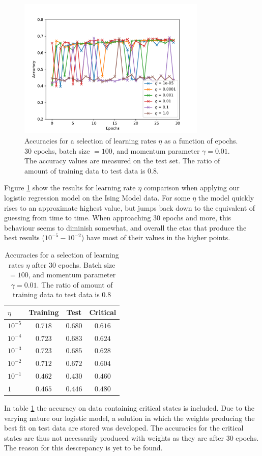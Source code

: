 \begin{figure}[H]
    \centering
\includegraphics[width = 0.8\textwidth]{figures/logistic_eta.pdf}
    \caption{Accuracies for a selection of learning rates $\eta$ as a function of epochs. 
    30 epochs, batch size $= 100$, and momentum parameter $\gamma = 0.01$. The accuracy
    values are measured on the test set.
    The ratio of amount of training data to test data is $0.8$.}
\label{fig:logistic-eta}
\end{figure}
Figure \ref{fig:logistic-eta} show the results for learning rate $\eta$ comparison when applying
our logistic regression model on the Ising Model data. For some $\eta$ the model quickly rises
to an approximate highest value, but jumps back down to the equivalent of guessing from time
to time. When approaching 30 epochs and more, this behaviour seems to diminish somewhat, and
overall the etas that produce the best results ($10^{-5} - 10^{-2}$) have most of their values
in the higher points.
\begin{table}[H]
\center
\begin{tabular}{l|c|c|c}
$\eta$ & Training & Test & Critical  \\
\hline
$10^{-5}$ & $0.718$ & $0.680$ & $0.616$ \\
$10^{-4}$ & $0.723$ & $0.683$ & $0.624$ \\
$10^{-3}$ & $0.723$ & $0.685$ & $0.628$ \\
$10^{-2}$ & $0.712$ & $0.672$ & $0.604$ \\
$10^{-1}$ & $0.462$ & $0.430$ & $0.460$ \\
$1$    & $0.465$ & $0.446$ & $0.480$
\end{tabular}
    \caption{Accuracies for a selection of learning rates $\eta$ after 
    30 epochs. Batch size $= 100$, and momentum parameter $\gamma = 0.01$.
    The ratio of amount of training data to test data is $0.8$}
    \label{tab:logistic-critical}
\end{table}
In table \ref{tab:logistic-critical} the accuracy on data containing critical states
is included. Due to the varying nature our logistic model, a solution in which the weights
producing the best fit on test data are stored was developed. The accuracies for the critical
states are thus not necessarily produced with weights as they are after 30 epochs. The reason for this descrepancy is yet to be found.

